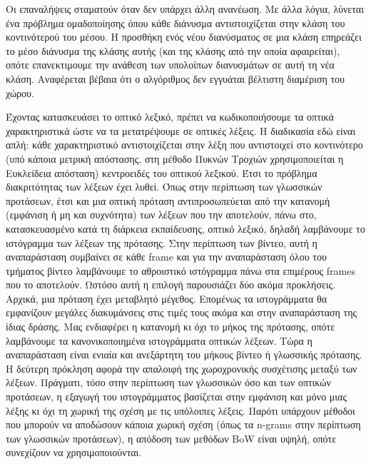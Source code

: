 \documentclass[11pt,a4paper,english,greek,twoside]{../Thesis}
\begin{document}
Οι επαναλήψεις σταματούν όταν δεν υπάρχει άλλη ανανέωση. Με άλλα λόγια, λύνεται ένα πρόβλημα ομαδοποίησης όπου κάθε διάνυσμα αντιστοιχίζεται στην κλάση του κοντινότερού του μέσου. Η προσθήκη ενός νέου διανύσματος σε μια κλάση επηρεάζει το μέσο διάνυσμα της κλάσης αυτής (και της κλάσης από την οποία αφαιρείται), οπότε επανεκτιμουμε την ανάθεση των υπολοίπων διανυσμάτων σε αυτή τη νέα κλάση. Αναφέρεται βέβαια ότι ο αλγόριθμος δεν εγγυάται βέλτιστη διαμέριση του χώρου.

\par Έχοντας κατασκευάσει το οπτικό λεξικό, πρέπει να κωδικοποιήσουμε τα οπτικά χαρακτηριστικά ώστε να τα μετατρέψουμε σε οπτικές λέξεις. Η διαδικασία εδώ είναι απλή: κάθε χαρακτηριστικό αντιστοιχίζεται στην λέξη που αντιστοιχεί στο κοντινότερο (υπό κάποια μετρική απόστασης, στη μέθοδο Πυκνών Τροχιών χρησιμοποιείται η Ευκλείδεια απόσταση) κεντροειδές του οπτικού λεξικού. Έτσι το πρόβλημα διακριτότητας των λέξεων έχει λυθεί. Όπως στην περίπτωση των γλωσσικών προτάσεων, έτσι και μια οπτική πρόταση αντιπροσωπεύεται από την κατανομή (εμφάνιση ή μη και συχνότητα) των λέξεων που την αποτελούν, πάνω στο, κατασκευασμένο κατά τη διάρκεια εκπαίδευσης, οπτικό λεξικό, δηλαδή λαμβάνουμε το ιστόγραμμα των λέξεων της πρότασης. Στην περίπτωση των βίντεο, αυτή η αναπαράσταση συμβαίνει σε κάθε frame και για την αναπαράσταση όλου του τμήματος βίντεο λαμβάνουμε το αθροιστικό ιστόγραμμα πάνω στα επιμέρους frames που το αποτελούν. Ωστόσο αυτή η επιλογή παρουσιάζει δύο ακόμα προκλήσεις. Αρχικά, μια πρόταση έχει μεταβλητό μέγεθος. Επομένως τα ιστογράμματα θα εμφανίζουν μεγάλες διακυμάνσεις στις τιμές τους ακόμα και στην αναπαράσταση της ίδιας δράσης. Μας ενδιαφέρει η κατανομή κι όχι το μήκος της πρότασης, οπότε λαμβάνουμε τα κανονικοποιημένα ιστογράμματα οπτικών λέξεων. Τώρα η αναπαράσταση είναι ενιαία και ανεξάρτητη του μήκους βίντεο ή γλωσσικής πρότασης. Η δεύτερη πρόκληση αφορά την απαλοιφή της χωροχρονικής συσχέτισης μεταξύ των λέξεων. Πράγματι, τόσο στην περίπτωση των γλωσσικών όσο και των οπτικών προτάσεων, η εξαγωγή του ιστογράμματος βασίζεται στην εμφάνιση και μόνο μιας λέξης κι όχι τη χωρική της σχέση με τις υπόλοιπες λέξεις. Παρότι υπάρχουν μέθοδοι που μπορούν να αποδώσουν κάποια χωρική σχέση (όπως τα n-grams στην περίπτωση των γλωσσικών προτάσεων), η απόδοση των μεθόδων BoW είναι υψηλή, οπότε συνεχίζουν να χρησιμοποιούνται.


\end{document}
